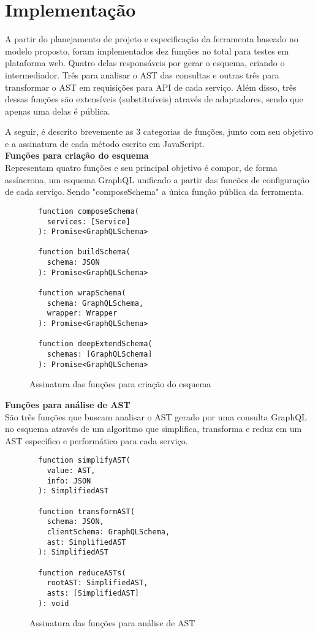 \section{Implementação}

A partir do planejamento de projeto e especificação da ferramenta baseado no modelo proposto, foram implementados dez funções no total para testes em plataforma web. Quatro delas responsáveis por gerar o esquema, criando o intermediador. Três para analisar o AST das consultas e outras três para transformar o AST em requisições para API de cada serviço. Além disso, três dessas funções são extensíveis (substituíveis) através de adaptadores, sendo que apenas uma delas é pública.

A seguir, é descrito brevemente as 3 categorias de funções, junto com seu objetivo e a assinatura de cada método escrito em JavaScript. \\

\textbf{Funções para criação do esquema} \\

Representam quatro funções e seu principal objetivo é compor, de forma assíncrona, um esquema GraphQL unificado a partir das funcões de configuração de cada serviço. Sendo "composeSchema" a única função pública da ferramenta.

\begin{figure}[H]
  \centering
  \begin{verbatim}
  function composeSchema(
    services: [Service]
  ): Promise<GraphQLSchema>

  function buildSchema(
    schema: JSON
  ): Promise<GraphQLSchema>

  function wrapSchema(
    schema: GraphQLSchema, 
    wrapper: Wrapper
  ): Promise<GraphQLSchema>

  function deepExtendSchema(
    schemas: [GraphQLSchema]
  ): Promise<GraphQLSchema>
  \end{verbatim}
  \caption{Assinatura das funções para criação do esquema}
\end{figure}

\textbf{Funções para análise de AST} \\

São três funções que buscam analisar o AST gerado por uma consulta GraphQL no esquema através de um algoritmo que simplifica, transforma e reduz em um AST específico e performático para cada serviço.

\begin{figure}[H]
  \centering
  \begin{verbatim}
  function simplifyAST(
    value: AST, 
    info: JSON
  ): SimplifiedAST

  function transformAST(
    schema: JSON,
    clientSchema: GraphQLSchema, 
    ast: SimplifiedAST
  ): SimplifiedAST

  function reduceASTs(
    rootAST: SimplifiedAST, 
    asts: [SimplifiedAST]
  ): void
  \end{verbatim}
  \caption{Assinatura das funções para análise de AST}
\end{figure}

